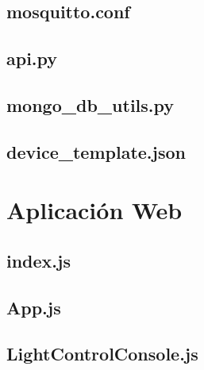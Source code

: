 \subsection{mosquitto.conf} \label{anexo-mosquitto.conf}



\subsection{api.py} \label{api.py}



\subsection{mongo\_db\_utils.py} \label{anexo-falsk-mongo}



\subsection{device\_template.json} \label{anexo-device-template}





\section{Aplicación Web} \label{anexo-app-web}



\subsection{index.js} \label{anexo-index.js}



\subsection{App.js} \label{anexo-app.js}



\subsection{LightControlConsole.js} \label{anexo-lightcontrolconsole.js}






